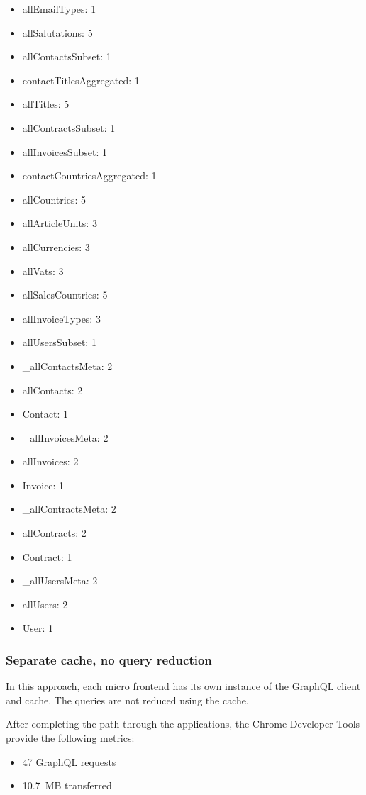 \begin{itemize}
    \item allEmailTypes: 1
    \item allSalutations: 5
    \item allContactsSubset: 1
    \item contactTitlesAggregated: 1
    \item allTitles: 5
    \item allContractsSubset: 1
    \item allInvoicesSubset: 1
    \item contactCountriesAggregated: 1
    \item allCountries: 5
    \item allArticleUnits: 3
    \item allCurrencies: 3
    \item allVats: 3
    \item allSalesCountries: 5
    \item allInvoiceTypes: 3
    \item allUsersSubset: 1
    \item \_allContactsMeta: 2
    \item allContacts: 2
    \item Contact: 1
    \item \_allInvoicesMeta: 2
    \item allInvoices: 2
    \item Invoice: 1
    \item \_allContractsMeta: 2
    \item allContracts: 2
    \item Contract: 1
    \item \_allUsersMeta: 2
    \item allUsers: 2
    \item User: 1
\end{itemize}

\subsubsection{Separate cache, no query reduction}

In this approach, each micro frontend has its own instance of the GraphQL client and cache. The queries are not reduced using the cache.

After completing the path through the applications, the Chrome Developer Tools provide the following metrics:

\begin{itemize}
    \item 47 GraphQL requests
    \item 10.7 MB transferred
\end{itemize}

